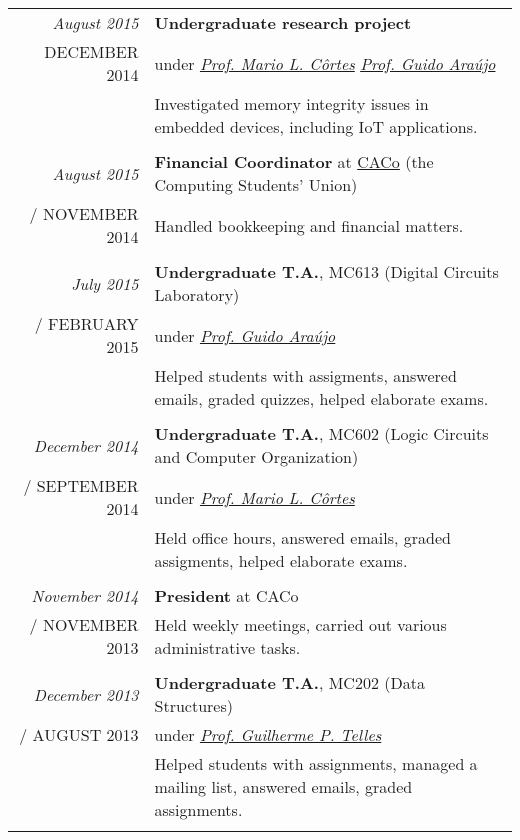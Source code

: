 \documentclass[a4paper,10pt]{article}
\makeatletter
\def\fakesc#1{%
  \begingroup%
  \xdef\fake@name{\csname\curr@fontshape/\f@size\endcsname}%
  \fontsize{\fontdimen8\fake@name}{\baselineskip}\selectfont%
  \uppercase{#1}%
  \endgroup%
}
\renewcommand{\textsc}{\fakesc}
\makeatother
\begin{document}
\begin{tabular}{r|p{11cm}}

    \emph{August 2015} & \textbf{Undergraduate research project}\\
  \textsc{December 2014} & under \href{http://www.ic.unicamp.br/~cortes/}{\emph{Prof. Mario L. Côrtes}} \href{http://guidoaraujo.wordpress.com/}{\emph{Prof. Guido Araújo}}\\
                 & \footnotesize {Investigated memory integrity issues in embedded devices, including IoT applications.}\\
  \multicolumn{2}{c}{} \\

  \emph{August 2015} & \textbf{Financial Coordinator} at \href{http://www.caco.ic.unicamp.br}{CACo} (the Computing Students' Union) \\
  \textsc{November 2014} & \footnotesize{Handled bookkeeping and financial matters.}\\
  \multicolumn{2}{c}{} \\

  \emph{July 2015} & \textbf{Undergraduate T.A.}, MC613 (Digital Circuits Laboratory)\\
  \textsc{February 2015} & under \href{http://guidoaraujo.wordpress.com/}{\emph{Prof. Guido Araújo}}\\
                 & \footnotesize {Helped students with assigments, answered emails, graded quizzes, helped elaborate exams.}\\
  \multicolumn{2}{c}{}\\

  \emph{December 2014} & \textbf{Undergraduate T.A.}, MC602 (Logic Circuits and Computer Organization)\\
  \textsc{September 2014} & under \href{http://www.ic.unicamp.br/~cortes/}{\emph{Prof. Mario L. Côrtes}}\\
                 & \footnotesize {Held office hours, answered emails, graded assigments, helped elaborate exams.}\\
  \multicolumn{2}{c}{}\\

  \emph{November 2014} & \textbf{President} at CACo \\
  \textsc{November 2013} & \footnotesize{Held weekly meetings, carried out various administrative tasks.}\\
  \multicolumn{2}{c}{} \\

  \emph{December 2013} & \textbf{Undergraduate T.A.},  MC202 (Data Structures)\\
  \textsc{August 2013} & under \href{http://ic.unicamp.br/~gpt/}{\emph{Prof. Guilherme P. Telles}}\\
                 & \footnotesize {Helped students with assignments, managed a mailing list, answered emails, graded assignments.}\\
  \multicolumn{2}{c}{}\\


\end{tabular}
\end{document}

